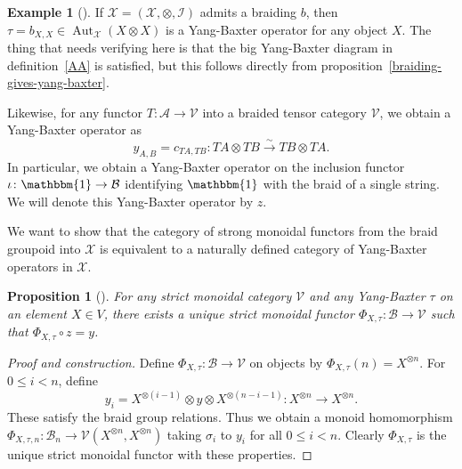 \documentclass[reqno]{amsart}
\newtheorem{proposition}[theorem]{Proposition}
\theoremstyle{definition}
\newtheorem{example}[theorem]{Example}
\theoremstyle{remark}
\DeclareMathOperator{\Aut}{Aut}
\begin{document}
     \begin{example}[]
         If $\mathcal{X} = \left( 
         \mathcal{X, \otimes, I}\right) $ admits a braiding
         $b$, then $\tau = b_{X,X} \in 
         \Aut_{\mathcal{X}} \left( X \otimes X \right) $ 
         is a Yang-Baxter operator for any object
         $X$. The thing that needs verifying here
         is that the big Yang-Baxter diagram in definition~\ref{AA}
         is satisfied, but
         this follows directly from
         proposition~\ref{braiding-gives-yang-baxter}.

         Likewise, for any functor
         $T \colon \mathcal{A} \to \mathcal{V}$ into a 
         braided tensor category $\mathcal{V}$, we obtain
         a Yang-Baxter operator as
         \[
         y_{A,B} = c_{TA,TB} \colon TA \otimes TB
         \stackrel{\sim}{\to } TB \otimes TA.
         \] 
         In particular, we obtain a Yang-Baxter operator
         on the inclusion functor 
         $\iota \colon \mathbbm{1} \to \mathcal{B}$ 
         identifying $\mathbbm{1}$ with the braid
         of a single string. We will
         denote this Yang-Baxter operator by $z$.
     \end{example}


     We want to show that the category of strong
     monoidal functors from the braid groupoid
     into $\mathcal{X}$ is equivalent to a naturally
     defined category of Yang-Baxter operators in
     $\mathcal{X}$.


     \begin{proposition}[]\label{yang-baxter-inducing-representation}
         For any strict monoidal category $\mathcal{V}$ and
         any Yang-Baxter $\tau$ on an element $X \in V$, there
         exists a unique strict monoidal functor
         $\Phi_{X, \tau} \colon \mathcal{B} \to \mathcal{V}$ such that
         $\Phi_{X, \tau} \circ z = y$.
     \end{proposition}


     \begin{proof}[Proof and construction]
         Define $\Phi_{X, \tau} \colon \mathcal{B} \to \mathcal{V}$ 
         on objects by $\Phi_{X,\tau} (n) = 
         X^{\otimes n}$. For
         $0 \le i < n$, define 
         \[
         y_i = X^{\otimes (i-1)} \otimes y 
         \otimes X^{\otimes (n-i-1)} \colon X^{\otimes n} \to 
         X^{\otimes n}.
         \] 
         These satisfy the braid group relations.
         Thus we obtain a monoid homomorphism
         $\Phi_{X, \tau, n} \colon \mathcal{B}_n \to 
         \mathcal{V} \left( X^{\otimes n}, X^{\otimes n} \right) $ 
         taking $\sigma_i$ to $y_i$ for all
         $0 \le i <n$. Clearly $\Phi_{X, \tau}$ is the unique
         strict monoidal functor with these properties.
     \end{proof}
\end{document}
